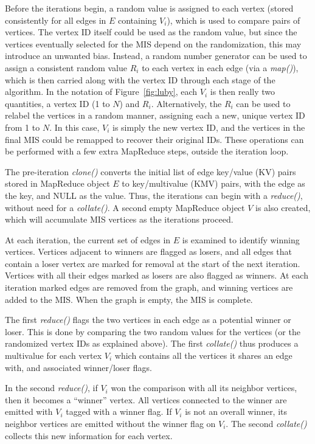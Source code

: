 Before the iterations begin, a random value is assigned to each vertex
(stored consistently for all edges in $E$ containing $V_i$), which is
used to compare pairs of vertices.  The vertex ID itself could be used
as the random value, but since the vertices eventually selected for
the MIS depend on the randomization, this may introduce an unwanted
bias.  Instead, a random number generator can be used to assign a
consistent random value $R_i$ to each vertex in each edge (via a {\it
map()}), which is then carried along with the vertex ID through each
stage of the algorithm.  In the notation of Figure~\ref{fig:luby},
each $V_i$ is then really two quantities, a vertex ID (1 to $N$) and
$R_i$.  Alternatively, the $R_i$ can be used to relabel the vertices
in a random manner, assigning each a new, unique vertex ID from 1 to
$N$.  In this case, $V_i$ is simply the new vertex ID, and the
vertices in the final MIS could be remapped to recover their original
IDs.  These operations can be performed with a few extra MapReduce
steps, outside the iteration loop.

The pre-iteration {\it clone()} converts the initial list of edge
key/value (KV) pairs stored in MapReduce object $E$ to key/multivalue
(KMV) pairs, with the edge as the key, and NULL as the value.  Thus,
the iterations can begin with a {\it reduce()}, without need for a
{\it collate()}.  A second empty MapReduce object $V$ is also created,
which will accumulate MIS vertices as the iterations proceed.

At each iteration, the current set of edges in $E$ is examined to
identify winning vertices.  Vertices adjacent to winners are flagged
as losers, and all edges that contain a loser vertex are marked for
removal at the start of the next iteration.  Vertices with all their
edges marked as losers are also flagged as winners.  At each iteration
marked edges are removed from the graph, and winning vertices are
added to the MIS.  When the graph is empty, the MIS is complete.

The first {\it reduce()} flags the two vertices in each edge as a
potential winner or loser.  This is done by comparing the two random
values for the vertices (or the randomized vertex IDs as explained
above).  The first {\it collate()} thus produces a multivalue for each
vertex $V_i$ which contains all the vertices it shares an edge with,
and associated winner/loser flags.

In the second {\it reduce()}, if $V_i$ won the comparison with all its
neighbor vertices, then it becomes a ``winner'' vertex.  All vertices
connected to the winner are emitted with $V_i$ tagged with a winner
flag.  If $V_i$ is not an overall winner, its neighbor vertices are
emitted without the winner flag on $V_i$.  The second {\it collate()}
collects this new information for each vertex.

